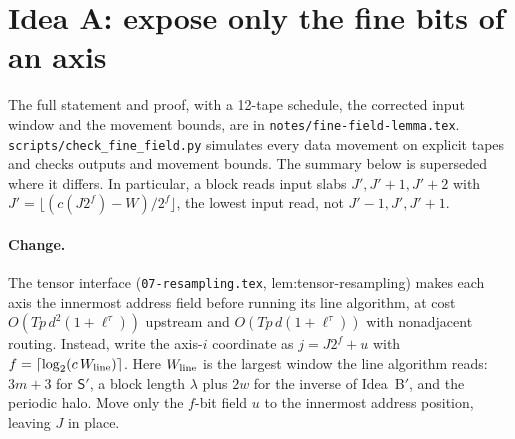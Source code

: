 \documentclass[11pt]{article}
\theoremstyle{remark}\newtheorem*{remark}{Remark}
\begin{document}
\section{Idea A: expose only the fine bits of an axis}

The full statement and proof, with a 12-tape schedule, the corrected input window and the movement bounds, are in \texttt{notes/fine-field-lemma.tex}. \texttt{scripts/check\_fine\_field.py} simulates every data movement on explicit tapes and checks outputs and movement bounds. The summary below is superseded where it differs. In particular, a block reads input slabs $J',J'+1,J'+2$ with $J'=\lfloor(c(J2^f)-W)/2^f\rfloor$, the lowest input read, not $J'-1,J',J'+1$.

\paragraph{Change.} The tensor interface (\texttt{07-resampling.tex}, lem:tensor-resampling)
makes each axis the innermost address field before running its line algorithm, at cost
$O(Tp\,d^2(1+\ell^\tau))$ upstream and $O(Tp\,d(1+\ell^\tau))$ with nonadjacent routing.
Instead, write the axis-$i$ coordinate as $j=J2^f+u$ with
$f=\lceil\log_2(c\,W_{\rm line})\rceil$. Here $W_{\rm line}$ is the largest window the line
algorithm reads: $3m+3$ for $\mathsf S'$, a block length $\lambda$ plus $2w$ for the inverse of
Idea~B$'$, and the periodic halo. Move only the $f$-bit field $u$ to the innermost address
position, leaving $J$ in place.
\end{document}
